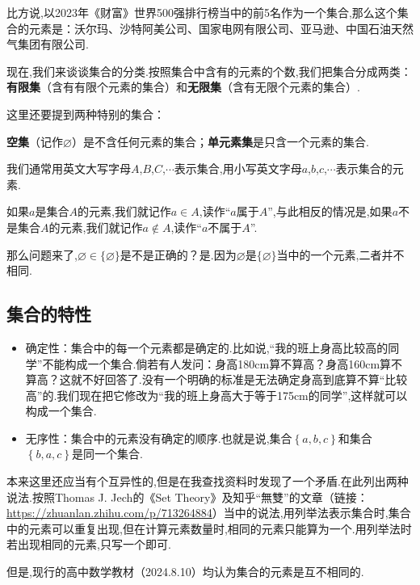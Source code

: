 \documentclass[lang=cn,math=cm,chinesefont=nofont,11pt,scheme=chinese,twocol]{elegantbook}
\begin{document}
比方说,以2023年《财富》世界500强排行榜当中的前5名作为一个集合,那么这个集合的元素是：沃尔玛、沙特阿美公司、国家电网有限公司、亚马逊、中国石油天然气集团有限公司.

现在,我们来谈谈集合的分类.按照集合中含有的元素的个数,我们把集合分成两类：\textbf{有限集}（含有有限个元素的集合）和\textbf{无限集}（含有无限个元素的集合）.

这里还要提到两种特别的集合：

\textbf{空集}（记作$\varnothing$）是不含任何元素的集合；\textbf{单元素集}是只含一个元素的集合.

\hspace*{\fill}

我们通常用英文大写字母$A$,$B$,$C$,$\cdots$表示集合,用小写英文字母$a$,$b$,$c$,$\cdots$表示集合的元素.

如果$a$是集合$A$的元素,我们就记作$a\in A$,读作“$a$属于$A$”,与此相反的情况是,如果$a$不是集合$A$的元素,我们就记作$a\notin A$,读作“$a$不属于$A$”.

那么问题来了,$\varnothing \in \{\varnothing\}$是不是正确的？是.因为$\varnothing$是$\{\varnothing\}$当中的一个元素,二者并不相同.

\subsection{集合的特性}

\begin{itemize}
  \item 确定性：集合中的每一个元素都是确定的.比如说,“我的班上身高比较高的同学”不能构成一个集合.倘若有人发问：身高180cm算不算高？身高160cm算不算高？这就不好回答了.没有一个明确的标准是无法确定身高到底算不算“比较高”的.我们现在把它修改为“我的班上身高大于等于175cm的同学”,这样就可以构成一个集合.
  
  \item 无序性：集合中的元素没有确定的顺序.也就是说,集合$\left\{a,b,c \right\}$和集合$\left\{b,a,c \right\}$是同一个集合.
\end{itemize}

本来这里还应当有个互异性的,但是在我查找资料时发现了一个矛盾.在此列出两种说法.按照Thomas J. Jech的《Set Theory》及知乎“無雙”的文章（链接：\href{https://zhuanlan.zhihu.com/p/713264884}{https://zhuanlan.zhihu.com/p/713264884}）当中的说法,用列举法表示集合时,集合中的元素可以重复出现,但在计算元素数量时,相同的元素只能算为一个.用列举法时若出现相同的元素,只写一个即可.

但是,现行的高中数学教材（2024.8.10）均认为集合的元素是互不相同的.
\end{document}
